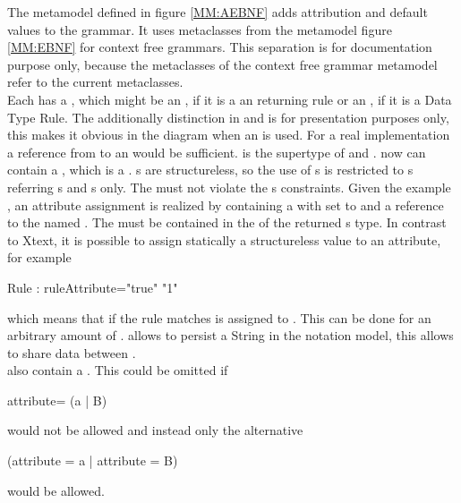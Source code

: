 The metamodel defined in figure \ref{MM:AEBNF} adds attribution and default values to the grammar. It uses metaclasses from the metamodel figure \ref{MM:EBNF} for context free grammars. This separation is for documentation purpose only, because the metaclasses of the context free grammar metamodel refer to the current metaclasses. \\
Each  has a , which might be an , if it is a an  returning rule or an , if it is a Data Type Rule. The additionally distinction in  and  is for presentation purposes only, this makes it obvious in the diagram when an  is used. For a real implementation a reference from  to an  would be sufficient.  is the supertype of  and .  now can contain a  , which is a .  s are structureless, so the use of s is restricted to  s referring s and  s only. The   must not violate the  s constraints. Given the example , an attribute assignment is realized by  containing a   with  set to   and a reference to the   named . The  must be contained in the   of the returned s type. In contrast to Xtext, it is possible to assign statically a structureless value to an attribute, for example 
\begin{xtxt}
Rule : {ruleAttribute="true"} "1"
\end{xtxt}   
which means that if the rule matches  is assigned to . This can be done for an arbitrary amount of .  allows to persist a String in the notation model, this allows to share data between . \\
 also contain a . This could be omitted if 
\begin{xtxt}
attribute= (a | B)
\end{xtxt}
would not be allowed and instead only the alternative 
\begin{xtxt}
(attribute = a | attribute = B)
\end{xtxt}
would be allowed.
